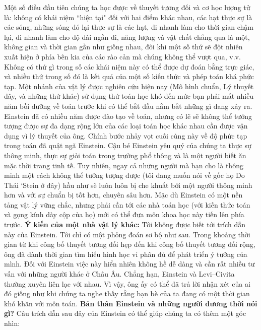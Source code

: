 \begin{multicols}{2}
	\vskip 0.1cm
	Một số điều đầu tiên chúng ta học được về thuyết tương đối và cơ học lượng tử là: không có  khái niệm ``hiện tại" đối với hai điểm khác nhau, các hạt thực sự là các sóng, những sóng đó lại thực sự là các hạt, đi nhanh làm cho thời gian chậm lại, đi nhanh làm cho độ dài ngắn đi, năng lượng và vật chất chẳng qua là một, không gian và thời gian gần như giống nhau, đôi khi một số thứ sẽ đột nhiên xuất hiện ở phía bên kia của các rào cản mà chúng không thể vượt qua,  v.v.
	\vskip 0.1cm
	Không có thứ gì trong số các khái niệm này có thể được dự đoán bằng trực giác, và nhiều thứ trong số đó là kết quả của một số kiến thức và phép toán khá phức tạp.  Một nhánh của vật lý được nghiên cứu hiện nay (Mô hình chuẩn, Lý thuyết dây, và những thứ khác) sử dụng thứ toán học khó đến mức bạn phải mất nhiều năm bồi dưỡng về toán trước khi  có thể bắt đầu nắm bắt những gì đang xảy ra.  Einstein đã có nhiều năm được đào tạo về toán, nhưng có lẽ sẽ không thể tưởng tượng được sự đa dạng rộng lớn của các loại toán học khác nhau cần được vận dụng vì lý thuyết của ông.
	\vskip 0.1cm
	Chính bước nhảy vọt cuối cùng này về độ phức tạp trong toán  đã quật ngã Einstein.  Cậu bé  Einstein yêu quý của chúng ta  thực sự thông minh, thực sự giỏi toán trong trường phổ thông và là một người biết ăn mặc thời trang tinh tế.  Tuy nhiên, ngay cả những người mà bạn cho là thông minh  một cách không thể tưởng tượng được (tôi đang muốn nói về gốc họ Do Thái `Stein ở đây) hầu như sẽ luôn luôn bị che khuất bởi một người thông minh hơn và với sự chuẩn bị tốt hơn, chuyên sâu hơn.  Mặc dù Einstein có một nền tảng vật lý vững chắc, nhưng  phải cần tới các nhà toán học (với kiến thức toán và  gọng kính dày cộp của họ) mới có thể  đưa môn khoa học này tiến lên phía trước.
	\vskip 0.1cm
	\textbf{\color{quantoan}Ý kiến của một nhà vật lý khác:} Tôi không được biết  tới trích dẫn này của Einstein. Tôi chỉ có một phỏng đoán sơ bộ như sau. Trong khoảng thời gian từ khi công bố thuyết tương đối hẹp đến khi công bố  thuyết tương đối rộng, ông đã dành thời gian tìm hiểu hình học vi phân đủ để phát triển ý tưởng của mình. Đối với Einstein việc này hiển nhiên không hề dễ dàng  và cần rất nhiều tư vấn với những người khác ở Châu Âu. Chẳng hạn, Einstein và Levi--Civita thường xuyên liên lạc với nhau. Vì vậy, ông ấy có thể đã trả lời nhận xét của ai đó giống như khi chúng ta  nghe  thấy rằng bạn bè của ta đang có một thời gian khó khăn với môn toán.
	\vskip 0.1cm
	\textbf{\color{quantoan}Bản thân Einstein và những người đương thời nói gì?}
	\vskip 0.1cm
	Câu trích dẫn sau đây của Einstein có thể giúp chúng ta có thêm một góc nhìn:

\end{multicols}
